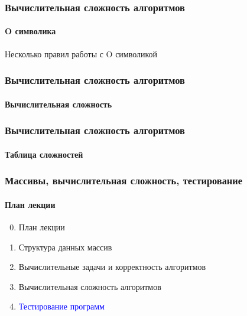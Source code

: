 \documentclass[aspectratio=169]{beamer}
\begin{document}
\begin{frame}
\frametitle{Вычислительная сложность алгоритмов}
\framesubtitle{O символика}
\justifying
Несколько правил работы с O символикой

\begin{figure}
    \captionsetup[subfigure]{labelformat=empty}
    \centering
\end{figure}
\end{frame}

\begin{frame}
\frametitle{Вычислительная сложность алгоритмов}
\framesubtitle{Вычислительная сложность}
\justifying

\begin{figure}
    \captionsetup[subfigure]{labelformat=empty}
    \centering
\end{figure}
\end{frame}

\begin{frame}
\frametitle{Вычислительная сложность алгоритмов}
\framesubtitle{Таблица сложностей}
\justifying

\begin{figure}
    \captionsetup[subfigure]{labelformat=empty}
    \centering
\end{figure}
\end{frame}

\begin{frame}
\frametitle{Массивы, вычислительная сложность, тестирование}
\framesubtitle{План лекции}

\begin{enumerate}
  \setcounter{enumi}{-1}
  \item{План лекции}
  \item{Структура данных массив}
  \item{Вычислительные задачи и корректность алгоритмов}
  \item{Вычислительная сложность алгоритмов}
  \item{\textcolor{blue}{Тестирование программ}}
\end{enumerate}
\end{frame}
\end{document}
